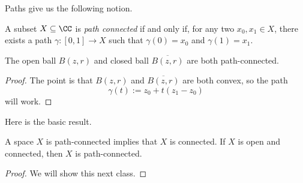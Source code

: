 Paths give us the following notion.
\begin{definition}
	A subset $X\subseteq\CC$ is \textit{path connected} if and only if, for any two $x_0,x_1\in X$, there exists a path $\gamma:[0,1]\to X$ such that $\gamma(0)=x_0$ and $\gamma(1)=x_1$.
\end{definition}
\begin{lemma}
	The open ball $B(z,r)$ and closed ball $\overline{B(z,r)}$ are both path-connected.
\end{lemma}
\begin{proof}
	The point is that $B(z,r)$ and $\overline{B(z,r)}$ are both convex, so the path
	\[\gamma(t):=z_0+t(z_1-z_0)\]
	will work.
\end{proof}
Here is the basic result.
\begin{proposition}
	A space $X$ is path-connected implies that $X$ is connected. If $X$ is open and connected, then $X$ is path-connected.
\end{proposition}
\begin{proof}
	We will show this next class.
\end{proof}